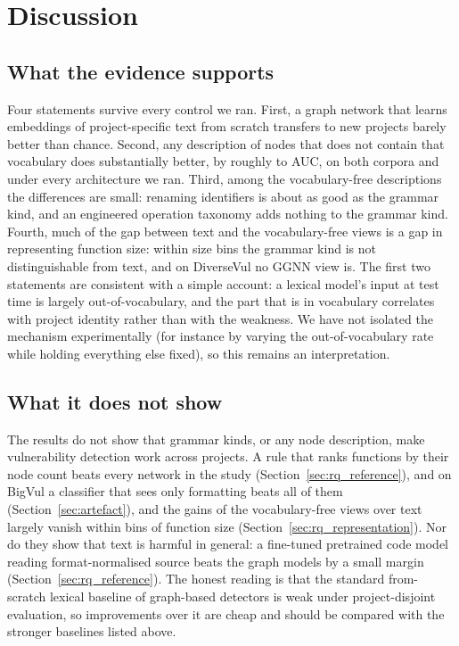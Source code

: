 \section{Discussion}
\label{sec:discussion}

\subsection{What the evidence supports}
Four statements survive every control we ran. First, a graph network that
learns embeddings of project-specific text from scratch transfers to new
projects barely better than chance. Second, any description of nodes that does
not contain that vocabulary does substantially better, by roughly \numdeltaMin{} to \numdeltaMax{}
AUC, on both corpora and under every architecture we ran. Third, among the
vocabulary-free descriptions the differences are small: renaming identifiers is
about as good as the grammar kind, and an engineered operation taxonomy adds
nothing to the grammar kind. Fourth, much of the gap between text and the
vocabulary-free views is a gap in representing function size: within size bins
the grammar kind is not distinguishable from text, and on DiverseVul no GGNN view is.
The first two statements are consistent with a simple account: a lexical model's input at test time is largely out-of-vocabulary, and
the part that is in vocabulary correlates with project identity rather than with
the weakness. We have not isolated the mechanism experimentally (for instance
by varying the out-of-vocabulary rate while holding everything else fixed), so
this remains an interpretation.

\subsection{What it does not show}
The results do not show that grammar kinds, or any node description, make
vulnerability detection work across projects. A rule that ranks functions by
their node count beats every network in the study (Section~\ref{sec:rq_reference}),
and on BigVul a classifier that sees only formatting beats all of them
(Section~\ref{sec:artefact}),
and the gains of the vocabulary-free views over text largely vanish within
bins of function size (Section~\ref{sec:rq_representation}). Nor do they
show that text is harmful in general: a fine-tuned pretrained code model reading
format-normalised source beats the graph models by a small margin
(Section~\ref{sec:rq_reference}). The honest reading is that the
standard from-scratch lexical baseline of graph-based detectors is weak under
project-disjoint evaluation, so improvements over it are cheap and should be
compared with the stronger baselines listed above.

